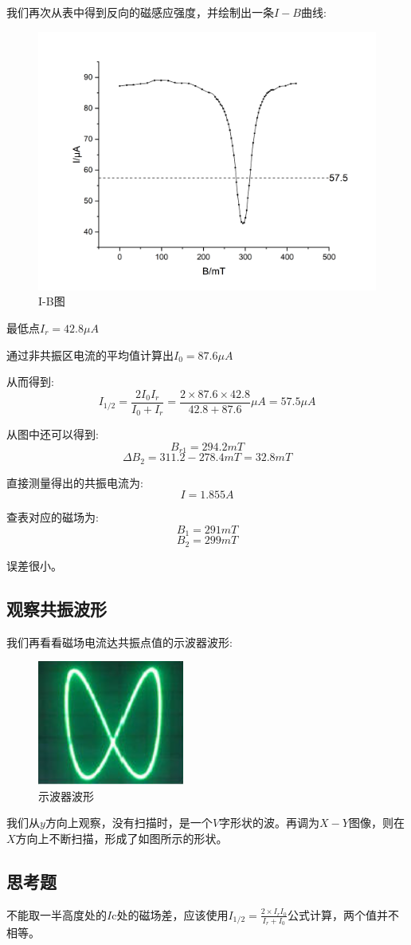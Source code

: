 \documentclass[UTF8]{ctexart}
\begin{document}
我们再次从表中得到反向的磁感应强度，并绘制出一条$I-B$曲线:
\begin{figure}[htb]
	\centering
	\includegraphics[scale=0.33]{Graph5.png}
	\caption{I-B图}
\end{figure}

最低点$I_r = 42.8 \mu A$

通过非共振区电流的平均值计算出$I_0 = 87.6 \mu A $

从而得到:
$$
I_{1/2}=\frac{2I_0I_r}{I_0+I_r}=\frac{2\times87.6\times42.8}{42.8+87.6}\mu A = 57.5\mu A
$$

从图中还可以得到:
$$B_{r1} = 294.2 mT $$
$$ \Delta B_2 = 311.2 - 278.4 mT = 32.8 mT $$

直接测量得出的共振电流为:
$$I = 1.855 A$$

查表对应的磁场为:
$$B_1 = 291 mT $$
$$B_2 = 299 mT $$

误差很小。

\subsection{观察共振波形}

我们再看看磁场电流达共振点值的示波器波形:
\begin{figure}[htb]
	\centering
	\includegraphics[scale=0.33]{1.png}
	\caption{示波器波形}
\end{figure}

我们从$y$方向上观察，没有扫描时，是一个$V$字形状的波。再调为$X-Y$图像，则在$X$方向上不断扫描，形成了如图所示的形状。

\subsection{思考题}

不能取一半高度处的$I$c处的磁场差，应该使用$I_{1/2} = \frac{2\times I_r I_0}{I_r + I_0}$公式计算，两个值并不相等。
\end{document}
